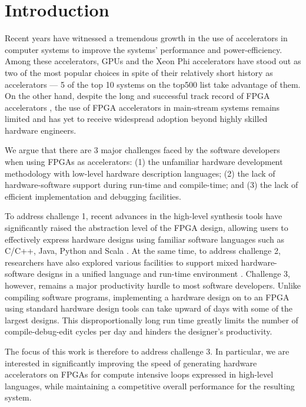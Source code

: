 \section{Introduction}\label{sec:introduction}
Recent years have witnessed a tremendous growth in the use of accelerators in computer systems to improve the systems' performance and power-efficiency. Among these accelerators, GPUs and the Xeon Phi accelerators have stood out as two of the most popular choices in spite of their relatively short history as accelerators --- 5 of the top 10 systems on the top500 list take advantage of them. On the other hand, despite the long and successful track record of FPGA accelerators \cite{SAT04Survey, Biocomp10Survey, bing2014FPGA}, the use of FPGA accelerators in main-stream systems remains limited and has yet to receive widespread adoption beyond highly skilled hardware engineers. 

We argue that there are 3 major challenges faced by the software developers when using FPGAs as accelerators: (1) the unfamiliar hardware development methodology with low-level hardware description languages; (2) the lack of hardware-software support during run-time and compile-time; and (3) the lack of efficient implementation and debugging facilities.

To address challenge 1, recent advances in the high-level synthesis tools have significantly raised the abstraction level of the FPGA design, allowing users to effectively express hardware designs using familiar software languages such as C/C++, Java, Python and Scala \cite{VivadoHLS,legup}. At the same time, to address challenge 2, researchers have also explored various facilities to support mixed hardware-software designs in a unified language \cite{openCL,SDAccel} and run-time environment \cite{SoTECS:2008,Lubbers:2009,Ismail:2011}. Challenge 3, however, remains a major productivity hurdle to most software developers. Unlike compiling software programs, implementing a hardware design on to an FPGA using standard hardware design tools can take upward of days with some of the largest designs. This disproportionally long run time greatly limits the number of compile-debug-edit cycles per day and hinders the designer's productivity.

The focus of this work is therefore to address challenge 3. In particular, we are interested in significantly improving the speed of generating hardware accelerators on FPGAs for compute intensive loops expressed in high-level languages, while maintaining a competitive overall performance for the resulting system.

